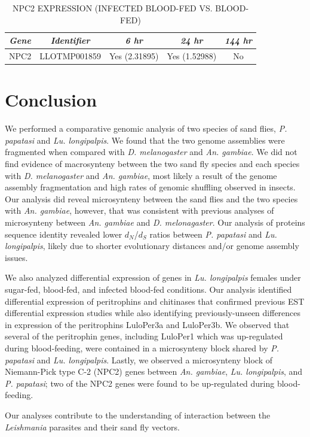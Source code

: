 \begin{table}[H]
  \begin{center}
  \caption{\label{tab:sandflies:stat-sig-npc2-bi} NPC2 EXPRESSION (INFECTED BLOOD-FED VS. BLOOD-FED)}
  \begin{tabular}{ c c c c c } \hline
    \emph{Gene} & \emph{Identifier} & \emph{6 hr} & \emph{24 hr} & \emph{144 hr} \\ \hline
    NPC2 & LLOTMP001859 & Yes (2.31895) & Yes (1.52988) & No
  \end{tabular}
  \end{center}
\end{table}


\section{Conclusion}
We performed a comparative genomic analysis of two species of sand flies, \emph{P. papatasi} and \emph{Lu. longipalpis}.  We found that the two genome assemblies were fragmented when compared with \emph{D. melanogaster} and \emph{An. gambiae}.  We did not find evidence of macrosynteny between the two sand fly species and each species with \emph{D. melanogaster} and \emph{An. gambiae}, most likely a result of the genome assembly fragmentation and high rates of genomic shuffling observed in insects.  Our analysis did reveal microsynteny between the sand flies and the two species with \emph{An. gambiae}, however, that was consistent with previous analyses of microsynteny between \emph{An. gambiae} and \emph{D. melonagaster}.  Our analysis of proteins sequence identity revealed lower $d_N$/$d_S$ ratios between \emph{P. papatasi} and \emph{Lu. longipalpis}, likely due to shorter evolutionary distances and/or genome assembly issues.

We also analyzed differential expression of genes in \emph{Lu. longipalpis} females under sugar-fed, blood-fed, and infected blood-fed conditions.  Our analysis identified differential expression of peritrophins and chitinases that confirmed previous EST differential expression studies while also identifying previously-unseen differences in expression of the peritrophins LuloPer3a and LuloPer3b. We observed that several of the peritrophin genes, including LuloPer1 which was up-regulated during blood-feeding, were contained in a microsynteny block shared by \emph{P. papatasi} and \emph{Lu. longipalpis}.  Lastly, we observed a microsynteny block of Niemann-Pick type C-2 (NPC2) genes between \emph{An. gambiae}, \emph{Lu. longipalpis}, and \emph{P. papatasi}; two of the NPC2 genes were found to be up-regulated during blood-feeding.

Our analyses contribute to the understanding of interaction between the \emph{Leishmania} parasites and their sand fly vectors.




